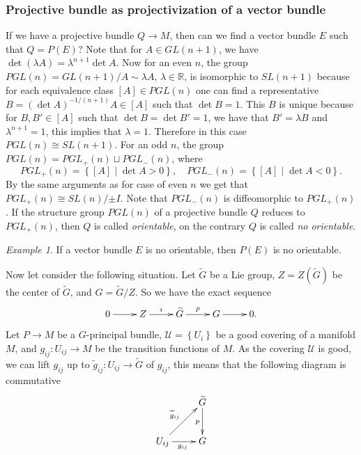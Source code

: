 \documentclass[12pt,letterpaper]{amsart}
\theoremstyle{definition}
\theoremstyle{plain}
\theoremstyle{remark}
\newtheorem{ex}{Example}
\begin{document}
\subsubsection{Projective bundle as projectivization of a vector bundle}
\label{subsubsec:4_2_2}
If we have a projective bundle $Q \to M$, then can we find a vector bundle $E$ such that $Q = P(E)$?
Note that for $A \in GL(n + 1)$, we have $\det (\lambda A) = \lambda^{n + 1} \det A$.
Now for an even $n$, the group $PGL(n) = GL(n + 1)/{A \sim \lambda A}$, $\lambda \in \mathbb{R}$, is isomorphic to $SL(n + 1)$ because for each equivalence class $[A] \in PGL(n)$ one can find a representative $B = (\det A)^{-1/(n + 1)} A \in [ A ]$ such that $\det B = 1$.
This $B$ is unique because for $B, B' \in [A]$ such that $\det B = \det B' = 1$, we have that $B' = \lambda B$ and $\lambda^{n + 1} = 1$, this implies that $\lambda = 1$.
Therefore in this case $PGL(n) \cong SL(n + 1)$.
For an odd $n$, the group $PGL(n) = PGL_{+}(n) \sqcup PGL_{-}(n)$, where
\begin{equation}
PGL_{+}(n) = \left\{ [ A ] \mid \det A > 0 \right\},
\quad
PGL_{-}(n) = \left\{ [ A ] \mid \det A < 0 \right\}.
\label{eq:47}
\end{equation}
By the same arguments as for case of even $n$ we get that $PGL_{+}(n) \cong SL(n)/{\pm I}$.
Note that $PGL_{-}(n)$ is diffeomorphic to $PGL_{+}(n)$.
If the structure group $PGL(n)$ of a projective bundle $Q$ reduces to $PGL_{+}(n)$, then $Q$ is called \emph{orientable}, on the contrary $Q$ is called \emph{no orientable}.
\begin{ex}
If a vector bundle $E$ is no orientable, then $P(E)$ is no orientable.
\label{ex:5}
\end{ex}
Now let consider the following situation.
Let $\widetilde{G}$ be a Lie group, $Z = Z(\widetilde{G})$ be the center of $\widetilde{G}$, and $G = \widetilde{G}/Z$.
So we have the exact sequence
\begin{equation}
\xymatrix{0 \ar[r] & Z \ar[r]^i &\widetilde{G} \ar[r]^p & G \ar[r] & 0.}
\label{eq:48}
\end{equation}
Let $P \to M$ be a $G$-principal bundle, $\mathcal{U} = \left\{ U_i \right\}$ be a good covering of a manifold $M$, and
$g_{ij} : U_{ij} \to M$ be the transition functions of $M$.
As the covering $\mathcal{U}$ is good, we can lift $g_{ij}$ up to $\widetilde{g}_{ij} : U_{ij} \to \widetilde{G}$ of $g_{ij}$, this means that the following diagram is commutative
\begin{equation}
\xymatrix{%
& \widetilde{G} \ar[d]_p
\\
U_{ij} \ar[ur]^{\widetilde{g}_{ij}} \ar[r]_{g_{ij}} & G%
}
\label{eq:49}
\end{equation}
\end{document}
